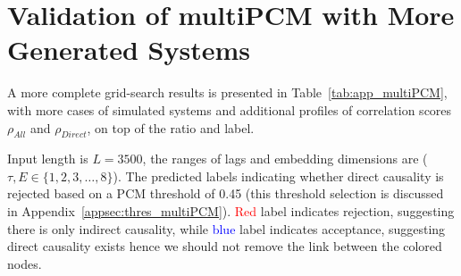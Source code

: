 \newpage

\appendix

\section{Validation of multiPCM with More Generated Systems}
\label{appsec:valid_multiPCM}

A more complete grid-search results is presented in Table~\ref{tab:app_multiPCM}, with more cases of simulated systems and additional profiles of correlation scores $\rho_{All}$ and $\rho_{Direct}$, on top of the ratio and label. 

Input length is $L = 3500$, the ranges of lags and embedding dimensions are ($\tau, E \in \{1, 2, 3, \ldots, 8\}$). The predicted labels indicating whether direct causality is rejected based on a PCM threshold of 0.45 (this threshold selection is discussed in Appendix~\ref{appsec:thres_multiPCM}). \textcolor{red}{Red} label indicates rejection, suggesting there is only indirect causality, while \textcolor{blue}{blue} label indicates acceptance, suggesting direct causality exists hence we should not remove the link between the colored nodes.

